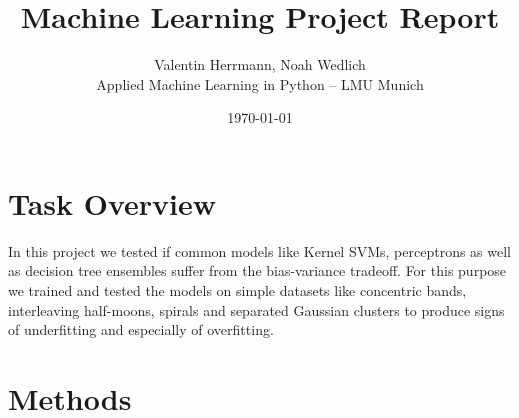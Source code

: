 \documentclass[11pt]{article}
\title{\textbf{Machine Learning Project Report}}
\author{Valentin Herrmann, Noah Wedlich \\
Applied Machine Learning in Python – LMU Munich}
\date{\today}
\begin{document}

\maketitle

\section{Task Overview}

In this project we tested if common models like Kernel SVMs, perceptrons as well as decision tree ensembles suffer from the bias-variance tradeoff. For this purpose we trained and tested the models on simple datasets like concentric bands, interleaving half-moons, spirals and separated Gaussian clusters to produce signs of underfitting and especially of overfitting.

\section{Methods}


\end{document}
